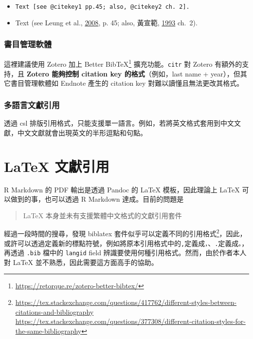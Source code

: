 \documentclass[oneside]{book}
\renewcommand{\href}[2]{#2\footnote{\url{#1}}}
\providecommand{\tightlist}{%
  \setlength{\itemsep}{0pt}\setlength{\parskip}{0pt}}
\renewcommand{\appendixname}{附錄}
\begin{document}
\begin{itemize}
  \begin{itemize}
  \tightlist
  \item
    \texttt{Text\ {[}see\ @citekey1\ pp.45;\ also,\ @citekey2\ ch.\ 2{]}.}
  \item
    Text (see Leung et al., \protect\hyperlink{ref-leung2008}{2008}, p. 45; also, 黃宣範, \protect\hyperlink{ref-huangxuanfan1993}{1993} ch.~2).
  \end{itemize}
\end{itemize}

\hypertarget{ref-manager}{%
\subsection{書目管理軟體}\label{ref-manager}}

這裡建議使用 Zotero 加上 \href{https://retorque.re/zotero-better-bibtex/}{Better BibTeX} 擴充功能。\texttt{citr} 對 Zotero 有額外的支持，且 \textbf{Zotero 能夠控制 citation key 的格式}（例如，last name + year），但其它書目管理軟體如 Endnote 產生的 citation key 對難以讀懂且無法更改其格式。

\hypertarget{multi-lang-cite}{%
\subsection{多語言文獻引用}\label{multi-lang-cite}}

透過 csl 排版引用格式，只能支援單一語言。例如，若將英文格式套用到中文文獻，中文文獻就會出現英文的半形逗點和句點。

\hypertarget{appendix-ux9644ux9304}{%
\appendix \addcontentsline{toc}{chapter}{\appendixname}}


\hypertarget{latex-cite-pkg}{%
\chapter{LaTeX 文獻引用}\label{latex-cite-pkg}}

R Markdown 的 PDF 輸出是透過 Pandoc 的 LaTeX 模板，因此理論上 LaTeX 可以做到的事，也可以透過 R Markdown 達成。目前的問題是

\begin{quote}
LaTeX 本身並未有支援繁體中文格式的文獻引用套件
\end{quote}

經過一段時間的搜尋，發現 biblatex 套件似乎可以定義不同的引用格式\footnote{\url{https://tex.stackexchange.com/questions/417762/different-styles-between-citations-and-bibliography}~\\
  \url{https://tex.stackexchange.com/questions/377308/different-citation-styles-for-the-same-bibliography}}，因此，或許可以透過定義新的標點符號，例如將原本引用格式中的\texttt{,}定義成\texttt{，}、\texttt{.}定義成\texttt{。}，再透過 \texttt{.bib} 檔中的 \texttt{langid} field 辨識要使用何種引用格式。然而，由於作者本人對 LaTeX 並不熟悉，因此需要這方面高手的協助。
\end{document}
